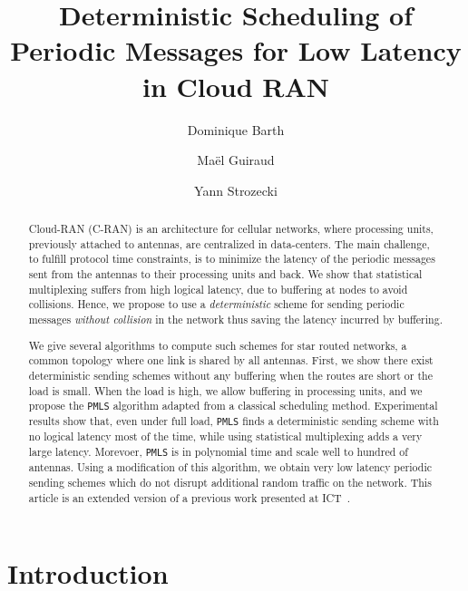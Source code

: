 \documentclass[a4paper,10pt]{journal}
\title{Deterministic Scheduling of Periodic Messages for Low Latency in Cloud RAN}
\author[1]{Dominique Barth}
\author[1,2]{Ma\"el Guiraud}
\author[1]{Yann Strozecki}
\affil[1]{David Laboratory, UVSQ}
\affil[2]{Nokia Bell Labs France}
\newcommand\PMLS{\texttt{PMLS}\xspace}
\begin{document}
\maketitle

\begin{abstract}
Cloud-RAN (C-RAN) is an architecture for cellular networks, where processing units, previously attached to antennas, are centralized in data-centers. The main challenge, to fulfill protocol time constraints, is to minimize the latency of the periodic messages sent from the antennas to their processing units and back. We show that statistical multiplexing suffers from high logical latency, due to buffering at nodes to avoid collisions. Hence, we propose to use a \emph{deterministic} scheme for sending periodic messages \emph{without collision} in the network thus saving the latency incurred by buffering.

We give several algorithms to compute such schemes for star routed networks, a common topology where one link is shared by all antennas. First, we show there exist deterministic sending schemes without any buffering when the routes are short or the load is small. When the load is high, we allow buffering in processing units, and we propose the \PMLS algorithm adapted from a classical scheduling method. Experimental results show that, even under full load, \PMLS finds a deterministic sending scheme with no logical latency most of the time, while using statistical multiplexing adds a very large latency. Morevoer, \PMLS is in polynomial time and scale well to hundred of antennas. Using a modification of this algorithm, we obtain very low latency periodic sending schemes which do not disrupt additional random traffic on the network. This article is an extended version of a previous work presented at ICT~\cite{Guir1806:Deterministic}.
\end{abstract}


\section{Introduction}
\end{document}
